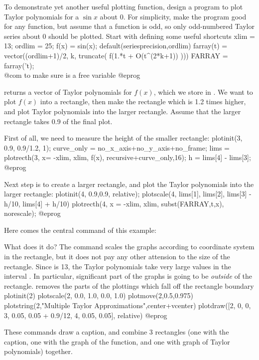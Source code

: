 To demonstrate yet another useful plotting function, design a program to
plot Taylor polynomials for a $\sin x$ about 0.  For simplicity, make the
program good for any function, but assume that a function is odd, so only
odd-numbered Taylor series about 0 should be plotted.  Start with defining
some useful shortcuts
\bprog
xlim = 13;  ordlim = 25;  f(x) = sin(x);
default(seriesprecision,ordlim)
farray(t) = vector((ordlim+1)/2, k, truncate( f(1.*t + O(t^(2*k+1)) )))
FARRAY = farray('t);  \\@com{} to make sure  is a free variable
@eprog

\noindent {} returns a vector of Taylor polynomials for
$f(x)$, which we store in .  We want to plot $f(x)$ into a
rectangle, then make the rectangle which is 1.2 times higher, and plot
Taylor polynomials into the larger rectangle.  Assume that the larger
rectangle takes 0.9 of the final plot.

First of all, we need to measure the height of the smaller rectangle:
\bprog
plotinit(3, 0.9, 0.9/1.2, 1);
curve_only = no_x_axis+no_y_axis+no_frame;
lims = plotrecth(3, x= -xlim, xlim, f(x), recursive+curve_only,16);
h = lims[4] - lims[3];
@eprog

\noindent Next step is to create a larger rectangle, and plot the Taylor
polynomials into the larger rectangle:
\bprog
plotinit(4, 0.9,0.9, relative);
plotscale(4, lims[1], lims[2], lims[3] - h/10, lims[4] + h/10)
plotrecth(4, x = -xlim, xlim, subst(FARRAY,t,x), norescale);
@eprog

Here comes the central command of this example:


\noindent What does it do?  The command 
scales the graphs according to coordinate system in the 
rectangle, but it does not pay any other attension to the size of
the rectangle.  Since  is 13, the Taylor polynomials take 
very large values in the interval .  In particular,
significant part of the graphs is going to be {\it outside} of the rectangle.
 removes the parts of the plottings which fall off the
rectangle boundary
\bprog
plotinit(2)
plotscale(2, 0.0, 1.0, 0.0, 1.0)
plotmove(2,0.5,0.975)
plotstring(2,"Multiple Taylor Approximations",center+vcenter)
plotdraw([2, 0, 0,  3, 0.05, 0.05 + 0.9/12,  4, 0.05, 0.05], relative)
@eprog

These commands draw a caption, and combine 3 rectangles (one with the
caption, one with the graph of the function, and one with graph of Taylor
polynomials) together.

